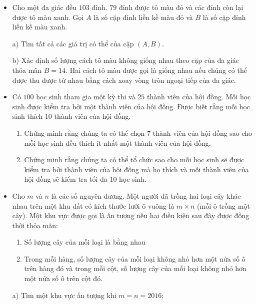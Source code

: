 \documentclass[11pt]{scrartcl}
\begin{document}
\begin{itemize}[label=, leftmargin=0em, itemsep=0.5em]
    \item\begin{btvn}
        Cho một đa giác đều $103$ đỉnh. $79$ đỉnh được tô màu đỏ và các đỉnh còn lại được tô màu xanh. Gọi $A$ là số cặp đỉnh liền kề màu đỏ và $B$ là số cặp đỉnh liền kề màu xanh.


        a) Tìm tất cả các giá trị có thể của cặp $(A,B).$


        b) Xác định số lượng cách tô màu không giống nhau theo cặp của đa giác thỏa mãn $B=14.$ Hai cách tô màu được gọi là giống nhau nếu chúng có thể được thu được từ nhau bằng cách xoay vòng tròn ngoại tiếp của đa giác.
        \end{btvn}

    \item \begin{btvn}
    Có $100$ học sinh tham gia một kỳ thi và $25$ thành viên của hội đồng. Mỗi học sinh được kiểm tra bởi một thành viên của hội đồng. Được biết rằng mỗi học sinh thích $10$ thành viên của hội đồng.
    \begin{enumerate}[label=(\alph*)]
        \item Chứng minh rằng chúng ta có thể chọn $7$ thành viên của hội đồng sao cho mỗi học sinh đều thích ít nhất một thành viên của hội đồng.
        \item Chứng minh rằng chúng ta có thể tổ chức sao cho mỗi học sinh sẽ được kiểm tra bởi thành viên của hội đồng mà họ thích và mỗi thành viên của hội đồng sẽ kiểm tra tối đa $10$ học sinh.
    \end{enumerate}
    \end{btvn}

    \item \begin{btvn}
        Cho $m$ và $n$ là các số nguyên dương. Một người đã trồng hai loại cây khác nhau trên một khu đất có kích thước lưới ô vuông là $m \times n$ (mỗi ô trồng một cây). Một khu vực được gọi là ấn tượng nếu hai điều kiện sau đây được đồng thời thỏa mãn:
        \begin{enumerate}
            \item Số lượng cây của mỗi loại là bằng nhau
            \item Trong mỗi hàng, số lượng cây của mỗi loại không nhỏ hơn một nửa số ô trên hàng đó và trong mỗi cột, số lượng cây của mỗi loại không nhỏ hơn một nửa số ô trên cột đó.
        \end{enumerate}
        a) Tìm một khu vực ấn tượng khi $m=n=2016$;



\end{btvn}
\end{itemize}
\end{document}
